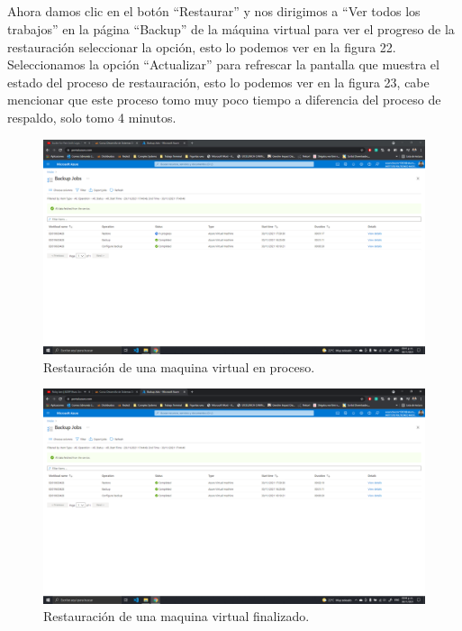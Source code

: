 \documentclass[11pt]{article}
\begin{document}
		\subsection*{}
    		Ahora damos clic en el botón ``Restaurar'' y nos dirigimos a ``Ver todos los trabajos'' en la página ``Backup'' de la máquina virtual para ver el progreso de la restauración seleccionar la opción, esto lo podemos ver en la figura 22. Seleccionamos la opción ``Actualizar'' para refrescar la pantalla que muestra el estado del proceso de restauración, esto lo podemos ver en la figura 23, cabe mencionar que este proceso tomo muy poco tiempo a diferencia del proceso de respaldo, solo tomo 4 minutos.
		\begin{figure}[H]
			\centering
			\includegraphics[scale=0.34]{resources/3.11.png}
			\caption{Restauración de una maquina virtual en proceso.}\label{fig:picture}
		\end{figure}
		\begin{figure}[H]
			\centering
			\includegraphics[scale=0.34]{resources/3.12.png}
			\caption{Restauración de una maquina virtual finalizado.}\label{fig:picture}
		\end{figure}
\end{document}
